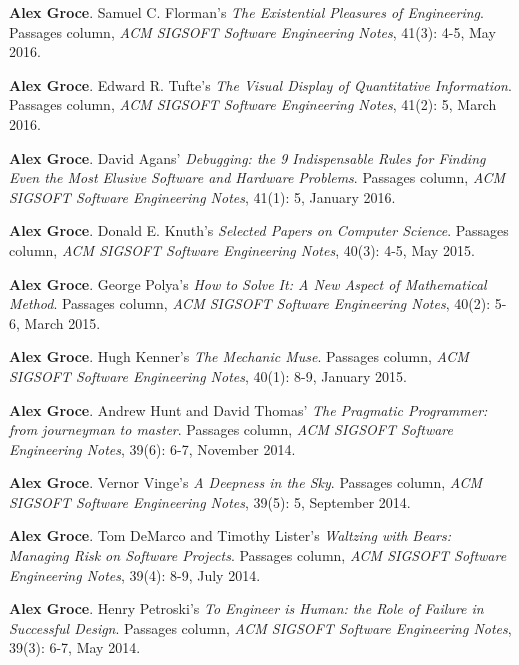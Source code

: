 \documentclass[ComputerScience]{vita}
\begin{document}
\begin{vita}
\begin{Columns, Book Reviews, and Magazine Articles}
\item {\bf Alex Groce}.
\newblock Samuel C. Florman's \emph{The Existential Pleasures of Engineering}.
\newblock Passages column, \emph{ACM SIGSOFT Software Engineering Notes}, 41(3): 4-5, May 2016.


\item {\bf Alex Groce}.
\newblock Edward R. Tufte's \emph{The Visual Display of Quantitative Information}.
\newblock Passages column, \emph{ACM SIGSOFT Software Engineering Notes}, 41(2): 5, March 2016.

\item {\bf Alex Groce}.
\newblock David Agans' \emph{Debugging: the 9 Indispensable Rules for Finding Even the Most Elusive Software and Hardware Problems}. 
\newblock Passages column, \emph{ACM SIGSOFT Software Engineering Notes}, 41(1): 5, January 2016.


\item {\bf Alex Groce}.
\newblock Donald E. Knuth's \emph{Selected Papers on Computer Science}.
\newblock Passages column, \emph{ACM SIGSOFT Software Engineering Notes}, 40(3): 4-5, May 2015.

\item{\bf Alex Groce}.
\newblock George Polya's \emph{How to Solve It: A New Aspect of Mathematical Method}.
\newblock Passages column, \emph{ACM SIGSOFT Software Engineering Notes}, 40(2): 5-6, March 2015.

\item {\bf Alex Groce}.
\newblock Hugh Kenner's \emph{The Mechanic Muse}.
\newblock Passages column, \emph{ACM SIGSOFT Software Engineering Notes}, 40(1): 8-9, January 2015.

\item {\bf Alex Groce}.
\newblock Andrew Hunt and David Thomas' \emph{The Pragmatic Programmer: from journeyman to master}.
\newblock Passages column, \emph{ACM SIGSOFT Software Engineering Notes}, 39(6): 6-7, November 2014.

\item {\bf Alex Groce}.
\newblock Vernor Vinge's \emph{A Deepness in the Sky}.
\newblock Passages column, \emph{ACM SIGSOFT Software Engineering Notes}, 39(5): 5, September 2014.

\item {\bf Alex Groce}.
\newblock Tom DeMarco and Timothy Lister's \emph{Waltzing with Bears: Managing Risk on Software Projects}.
\newblock Passages column, \emph{ACM SIGSOFT Software Engineering Notes}, 39(4): 8-9, July 2014.

\item {\bf Alex Groce}.
\newblock Henry Petroski's \emph{To Engineer is Human: the Role of Failure in Successful Design}.
\newblock Passages column, \emph{ACM SIGSOFT Software Engineering Notes}, 39(3): 6-7, May 2014.


\end{Columns, Book Reviews, and Magazine Articles}
\end{vita}
\end{document}
